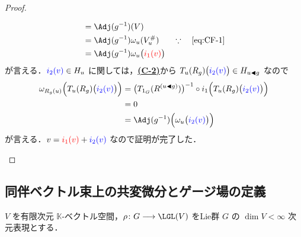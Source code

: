 \documentclass[TQFT_main]{subfiles}
\begin{document}
\begin{proof}
\begin{enumerate}
\begin{description}
\begin{description}
\begin{align}
                    &= \Adj (g^{-1})(V) &&\\
                    &= \Adj (g^{-1})\omega_u(V^\#_u) &&\because\quad \text{\eqref{eq:CF-1}}\\
                    &= \Adj (g^{-1})\omega_u\bigl(\textcolor{red}{i_1(v)}\bigr) &&
                \end{align}
                が言える．$\textcolor{blue}{i_2(v)} \in H_u$ に関しては，\hyperref[def:connection]{\textbf{\textsf{(C-2)}}}から $T_u (R_g)\bigl(\textcolor{blue}{i_2(v)}\bigr) \in H_{u \blacktriangleleft g}$ なので
                \begin{align}
                    \omega_{R_g(u)} \Bigl( T_u (R_g)\bigl(\textcolor{blue}{i_2(v)}\bigr) \Bigr) 
                    &= \bigl( T_{1_G}(R^{(u \btl g)}) \bigr)^{-1} \circ i_1 \Bigl(T_u (R_g)\bigl(\textcolor{blue}{i_2(v)}\bigr)\Bigr) \\
                    &= 0 \\
                    &= \Adj(g^{-1}) \Bigl( \omega_u \bigl(\textcolor{blue}{i_2(v)}\bigr) \Bigr) 
                \end{align}
                が言える．$v = \textcolor{red}{i_1(v)} + \textcolor{blue}{i_2(v)}$ なので証明が完了した．
                
                
            \end{description}
            
        \end{description}
        
    \end{enumerate}
\end{proof}

\subsection{同伴ベクトル束上の共変微分とゲージ場の定義}

$V$ を有限次元 $\mathbb{K}$-ベクトル空間，$\rho \colon G \lto \LGL(V)$ をLie群 $G$ の $\dim V < \infty$ 次元表現とする．
\end{document}
